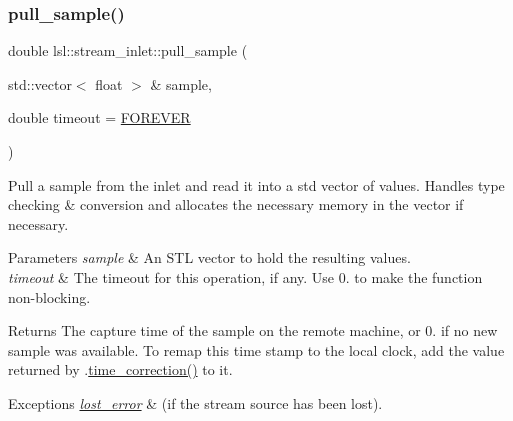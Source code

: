 \subsubsection{\texorpdfstring{pull\+\_\+sample()}{pull\_sample()}\hspace{0.1cm}{\footnotesize\ttfamily [2/3]}}
{\footnotesize\ttfamily double lsl\+::stream\+\_\+inlet\+::pull\+\_\+sample (\begin{DoxyParamCaption}\item[{std\+::vector$<$ float $>$ \&}]{sample,  }\item[{double}]{timeout = {\ttfamily \hyperlink{namespacelsl_a74cfbc9077aca21295117217249721ed}{F\+O\+R\+E\+V\+ER}} }\end{DoxyParamCaption})\hspace{0.3cm}{\ttfamily [inline]}}

Pull a sample from the inlet and read it into a std vector of values. Handles type checking \& conversion and allocates the necessary memory in the vector if necessary. 
\begin{DoxyParams}{Parameters}
{\em sample} & An S\+TL vector to hold the resulting values. \\
\hline
{\em timeout} & The timeout for this operation, if any. Use 0. to make the function non-\/blocking. \\
\hline
\end{DoxyParams}
\begin{DoxyReturn}{Returns}
The capture time of the sample on the remote machine, or 0. if no new sample was available. To remap this time stamp to the local clock, add the value returned by .\hyperlink{classlsl_1_1stream__inlet_a845d95f5fc60fb9cd01fb73d3da75e94}{time\+\_\+correction()} to it. 
\end{DoxyReturn}

\begin{DoxyExceptions}{Exceptions}
{\em \hyperlink{classlsl_1_1lost__error}{lost\+\_\+error}} & (if the stream source has been lost). \\
\hline
\end{DoxyExceptions}
\mbox{\label{classlsl_1_1stream__inlet_a4a10bd640a10c317ba4a0244cc986146}} 
